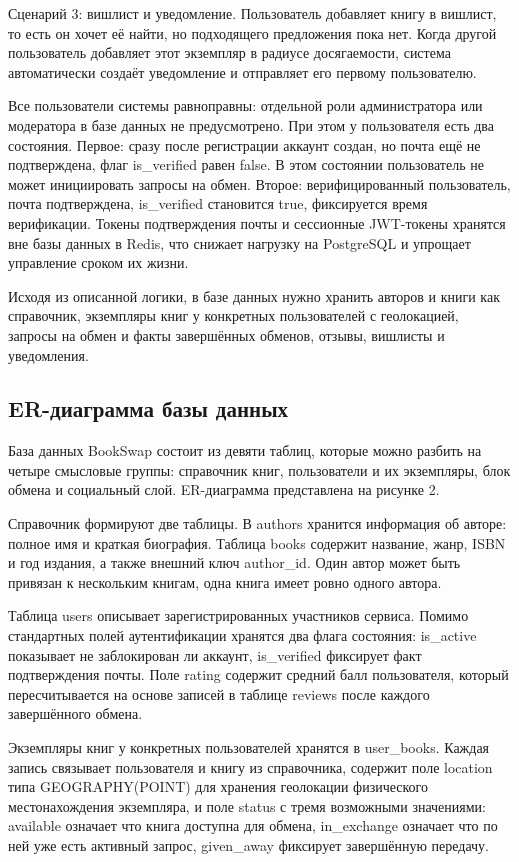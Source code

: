 \documentclass[14pt,a4paper]{extarticle}
\begin{document}
Сценарий 3: вишлист и уведомление. Пользователь добавляет книгу в
вишлист, то есть он хочет её найти, но подходящего предложения пока нет.
Когда другой пользователь добавляет этот экземпляр в радиусе
досягаемости, система автоматически создаёт уведомление и отправляет его
первому пользователю.

Все пользователи системы равноправны: отдельной роли администратора или
модератора в базе данных не предусмотрено. При этом у пользователя есть
два состояния. Первое: сразу после регистрации аккаунт создан, но почта
ещё не подтверждена, флаг is\_verified равен false. В этом состоянии
пользователь не может инициировать запросы на обмен. Второе:
верифицированный пользователь, почта подтверждена, is\_verified
становится true, фиксируется время верификации. Токены подтверждения
почты и сессионные JWT-токены хранятся вне базы данных в Redis, что
снижает нагрузку на PostgreSQL и упрощает управление сроком их жизни.

Исходя из описанной логики, в базе данных нужно хранить авторов и книги
как справочник, экземпляры книг у конкретных пользователей с
геолокацией, запросы на обмен и факты завершённых обменов, отзывы,
вишлисты и уведомления.

\subsection{ER-диаграмма базы данных}

База данных BookSwap состоит из девяти таблиц, которые можно разбить на
четыре смысловые группы: справочник книг, пользователи и их экземпляры,
блок обмена и социальный слой. ER-диаграмма представлена на рисунке 2.

Справочник формируют две таблицы. В authors хранится информация об
авторе: полное имя и краткая биография. Таблица books содержит название,
жанр, ISBN и год издания, а также внешний ключ author\_id. Один автор
может быть привязан к нескольким книгам, одна книга имеет ровно одного
автора.

Таблица users описывает зарегистрированных участников сервиса. Помимо
стандартных полей аутентификации хранятся два флага состояния:
is\_active показывает не заблокирован ли аккаунт, is\_verified фиксирует
факт подтверждения почты. Поле rating содержит средний балл
пользователя, который пересчитывается на основе записей в таблице
reviews после каждого завершённого обмена.

Экземпляры книг у конкретных пользователей хранятся в user\_books.
Каждая запись связывает пользователя и книгу из справочника, содержит
поле location типа GEOGRAPHY(POINT) для хранения геолокации физического
местонахождения экземпляра, и поле status с тремя возможными значениями:
available означает что книга доступна для обмена, in\_exchange означает
что по ней уже есть активный запрос, given\_away фиксирует завершённую
передачу.
\end{document}
